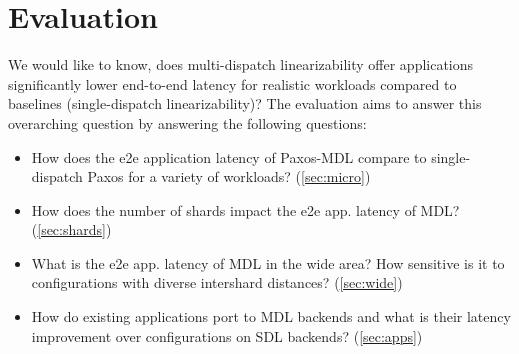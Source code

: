 \onecolumn\twocolumn
\section{Evaluation}
\label{sec:eval}

We would like to know, does multi-dispatch linearizability offer applications significantly lower end-to-end latency for realistic workloads compared to baselines (single-dispatch linearizability)?
The evaluation aims to answer this overarching question by answering the following questions:

\begin{itemize}

\item How does the e2e application latency of Paxos-MDL compare to single-dispatch Paxos for a variety of workloads? (\ref{sec:micro}) 

\item How does the number of shards impact the e2e app. latency of MDL? (\ref{sec:shards})

\item What is the e2e app. latency of MDL in the wide area? How sensitive is it to configurations with diverse intershard distances? (\ref{sec:wide})

\item How do existing applications port to MDL backends and what is their latency improvement over configurations on SDL backends? (\ref{sec:apps})
\end{itemize}

